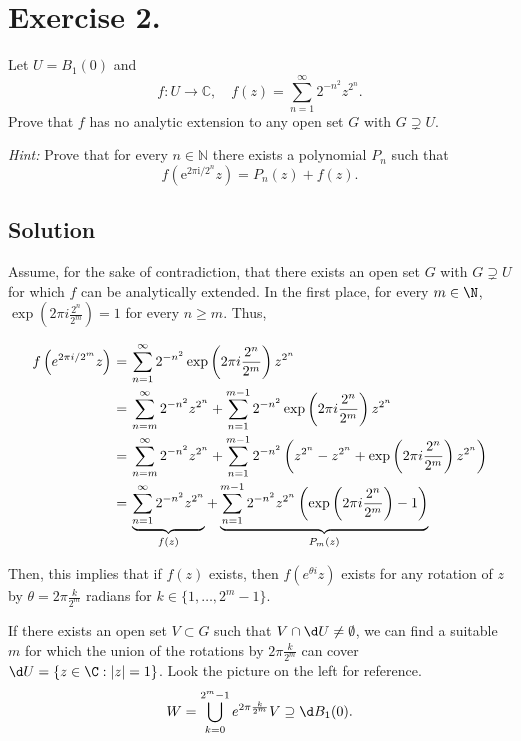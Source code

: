 \section*{Exercise 2.}

Let $U = B_{1}(0)$ and 
\[
f : U \to \mathbb{C}, \quad f(z) = \sum_{n=1}^{\infty} 2^{-n^{2}} z^{2^{n}}.
\]
Prove that $f$ has no analytic extension to any open set $G$ with $G \supsetneq U$.

\textit{Hint:} Prove that for every $n \in \mathbb{N}$ there exists a polynomial $P_{n}$ such that
\[
f \left( \mathrm{e}^{2 \pi \mathrm{i} / 2^{n}} z \right) = P_{n}(z) + f(z).
\]

\subsection*{Solution}

Assume, for the sake of contradiction, that there exists an open set $G$ with $G \supsetneq U$ for which $f$ can be analytically extended. In the first place, for every $m\in \N$, $\exp\left( 2\pi i \frac{2^n}{2^m} \right) = 1$ for every $n \geq m$. Thus,
\[ \everymath{\displaystyle}
\arraycolsep=1.8pt\def\arraystretch{2.5}
\begin{array}{rcl}
    f\left( e^{2\pi i / 2^m } z \right) & = & \sum_{n = 1}^{\infty} 2^{-n^2} \exp\left( 2\pi i \frac{2^n}{2^m} \right) z^{2^n}\\
    & = & \sum_{n = m}^{\infty} 2^{-n^2} z^{2^n} + \sum_{n = 1}^{m-1} 2^{-n^2} \exp\left( 2\pi i \frac{2^n}{2^m} \right) z^{2^n}\\
    & = & \sum_{n = m}^{\infty} 2^{-n^2} z^{2^n} + \sum_{n = 1}^{m-1} 2^{-n^2} \left( z^{2^n} - z^{2^n} + \exp\left( 2\pi i \frac{2^n}{2^m} \right) z^{2^n} \right)\\
    & = & \underbrace{\sum_{n = 1}^{\infty} 2^{-n^2} z^{2^n}}_{f(z)} + \underbrace{\sum_{n = 1}^{m-1} 2^{-n^2} z^{2^n} \left( \exp\left( 2\pi i \frac{2^n}{2^m} \right) - 1 \right)}_{P_m(z)}
\end{array} \]



\begin{multicols}{2}
    \begin{figure}[H]
        \centering
        
    \end{figure}

    Then, this implies that if $f(z)$ exists, then $f(e^{\theta i} z)$ exists for any rotation of $z$ by $\theta = 2\pi \frac{k}{2^m}$ radians for $k \in \{1,\ldots, 2^m-1\}$. 
    
    If there exists an open set $V \subset G$ such that $V \cap \d U \neq \emptyset$, we can find a suitable $m$ for which the union of the rotations by $2\pi \frac{k}{2^m}$ can cover $\d U = \{z \in \C : |z| = 1\}$. Look the picture on the left for reference.
    \[ W = \bigcup_{k = 0}^{2^m - 1} e^{2\pi \frac{k}{2^m}} V \supseteq \d B_1(0). \]
\end{multicols}

